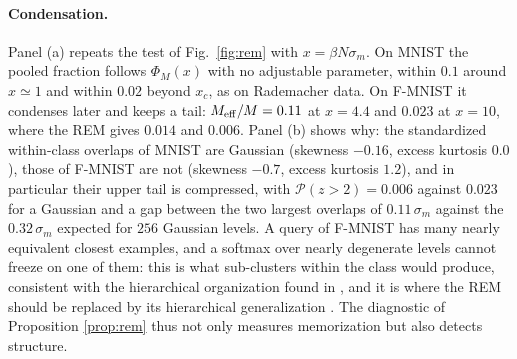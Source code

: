 \documentclass{SciPost}
\theoremstyle{plain}
\theoremstyle{definition}
\newcommand{\Meff}{M_{\rm eff}}
\begin{document}
\paragraph{Condensation.} Panel (a) repeats the test of Fig.\ \ref{fig:rem} with $x=\beta N\sigma_m$. On MNIST the pooled fraction follows $\Phi_M(x)$ with no adjustable parameter, within $0.1$ around $x\simeq1$ and within $0.02$ beyond $x_c$, as on Rademacher data. On F-MNIST it condenses later and keeps a tail: $\Meff/M=0.11$ at $x=4.4$ and $0.023$ at $x=10$, where the REM gives $0.014$ and $0.006$. Panel (b) shows why: the standardized within-class overlaps of MNIST are Gaussian (skewness $-0.16$, excess kurtosis $0.0$), those of F-MNIST are not (skewness $-0.7$, excess kurtosis $1.2$), and in particular their upper tail is compressed, with $\mathcal P(z>2)=0.006$ against $0.023$ for a Gaussian and a gap between the two largest overlaps of $0.11\,\sigma_m$ against the $0.32\,\sigma_m$ expected for $256$ Gaussian levels. A query of F-MNIST has many nearly equivalent closest examples, and a softmax over nearly degenerate levels cannot freeze on one of them: this is what sub-clusters within the class would produce, consistent with the hierarchical organization found in \cite{Alemanno2023}, and it is where the REM should be replaced by its hierarchical generalization \cite{Derrida1985,DerridaGardner1986}. The diagnostic of Proposition \ref{prop:rem} thus not only measures memorization but also detects structure.
\end{document}
